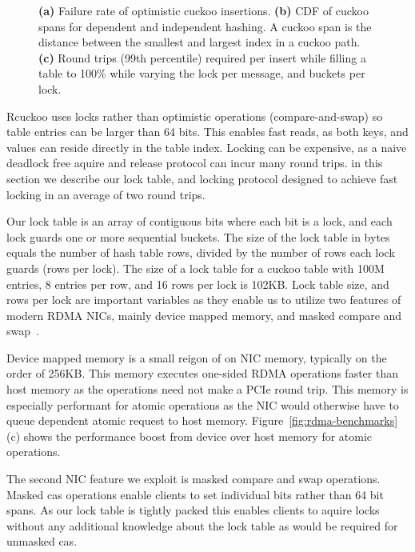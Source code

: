 \begin{figure}[t]
\begin{subfigure}{0.3\linewidth}
    \end{subfigure}
    \vspace{-1em}
    \caption{
    \textbf{(a)} Failure rate of optimistic cuckoo insertions.
    \textbf{(b)} CDF of cuckoo spans for dependent and independent hashing. A cuckoo span is the distance between the smallest and largest index in a cuckoo path.
    \textbf{(c)} Round trips (99th percentile) required per insert while filling a table to 100\% while varying the lock per message, and buckets per lock. 
    }
    \label{fig:cuckoo-problems}

\end{figure}

Rcuckoo uses locks rather than optimistic operations
(compare-and-swap) so table entries can be larger than 64
bits. This enables fast reads, as both keys, and values can
reside directly in the table index. Locking can be
expensive, as a naive deadlock free aquire and release
protocol can incur many round trips.  in this section we
describe our lock table, and locking protocol designed to
achieve fast locking in an average of two round trips.

Our lock table is an array of contiguous bits where each bit
is a lock, and each lock guards one or more sequential
buckets. The size of the lock table in bytes equals the
number of hash table rows, divided by the number of rows
each lock guards (rows per lock). The size of a lock table
for a cuckoo table with 100M entries, 8 entries per row, and
16 rows per lock is 102KB.  Lock table size, and rows per
lock are important variables as they enable us to utilize
two features of modern RDMA NICs, mainly device mapped
memory, and masked compare and
swap~\cite{rdma-masked-cas,sherman}.

Device mapped memory is a small reigon of on NIC memory,
typically on the order of 256KB. This memory executes
one-sided RDMA operations faster than host memory as the
operations need not make a PCIe round trip. This memory is
especially performant for atomic operations as the NIC would
otherwise have to queue dependent atomic request to host
memory. Figure~\ref{fig:rdma-benchmarks}(c) shows the
performance boost from device over host memory for atomic
operations.

The second NIC feature we exploit is masked compare and swap
operations. Masked cas operations enable clients to set
individual bits rather than 64 bit spans. As our lock table
is tightly packed this enables clients to aquire locks
without any additional knowledge about the lock table as
would be required for unmasked cas.

